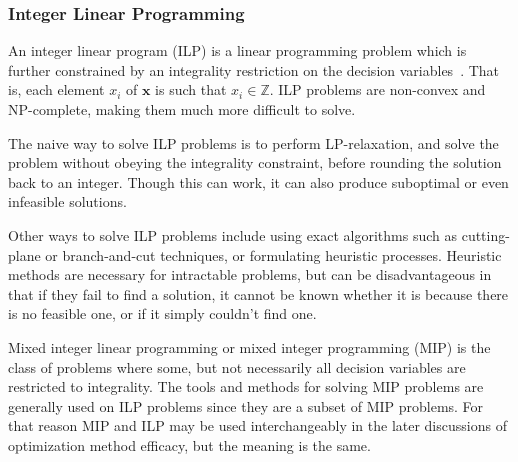 \documentclass[../mthe-493-final-project.tex]{subfiles}
\begin{document}
    \subsubsection{Integer Linear Programming}
    
    \label{sssec:integer-linear-programming}

        An integer linear program (ILP) is a linear programming problem which is further constrained by an integrality restriction on the decision variables~\cite{integer_programming}. That is, each element $x_i$ of $\mathbf{x}$ is such that $x_i \in \mathbb{Z}$. ILP problems are non-convex and NP-complete, making them much more difficult to solve.
        
        
        The naive way to solve ILP problems is to perform LP-relaxation, and solve the problem without obeying the integrality constraint, before rounding the solution back to an integer. Though this can work, it can also produce suboptimal or even infeasible solutions.
        
        Other ways to solve ILP problems include using exact algorithms such as cutting-plane or branch-and-cut techniques, or formulating heuristic processes. Heuristic methods are necessary for intractable problems, but can be disadvantageous in that if they fail to find a solution, it cannot be known whether it is because there is no feasible one, or if it simply couldn't find one.
        
        Mixed integer linear programming or mixed integer programming (MIP) is the class of problems where some, but not necessarily all decision variables are restricted to integrality. The tools and methods for solving MIP problems are generally used on ILP problems since they are a subset of MIP problems. For that reason MIP and ILP may be used interchangeably in the later discussions of optimization method efficacy, but the meaning is the same.
\end{document}
